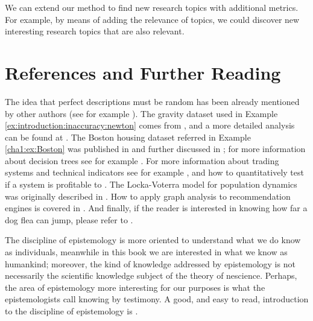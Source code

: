 We can extend our method to find new research topics with additional metrics. For example, by means of adding the relevance of topics, we could discover new interesting research topics that are also relevant.

%
%

\section{References and Further Reading}

The idea that perfect descriptions must be random has been already mentioned by other authors (see for example \cite{mosterin2016conceptos}). The gravity dataset used in Example \ref{ex:introduction:inaccuracy:newton} comes from \cite{cressie1982playing}, and a more detailed analysis can be found at \cite{davison1997bootstrap}. The Boston housing dataset referred in Example \ref{cha1:ex:Boston} was published in \cite{harrison1978hedonic} and further discussed in \cite{belsley2005regression}; for more information about decision trees see for example \cite{james2013introduction}. For more information about trading systems and technical indicators see for example \cite{kaufman2013trading}, and how to quantitatively test if a system is profitable to \cite{pardo1992design}. The Locka-Voterra model for population dynamics was originally described in \cite{lotka1920analytical}. How to apply graph analysis to recommendation engines is covered in \cite{cordobes2015empirical}. And finally, if the reader is interested in knowing how far a dog flea can jump, please refer to \cite{cadiergues2000comparison}.

The discipline of epistemology is more oriented to understand what we do know as individuals, meanwhile in this book we are interested in what we know as humankind; moreover, the kind of knowledge addressed by epistemology is not necessarily the scientific knowledge subject of the theory of nescience. Perhaps, the area of epistemology more interesting for our purposes is what the epistemologists call knowing by testimony. A good, and easy to read, introduction to the discipline of epistemology is \cite{nagel2014knowledge}.



